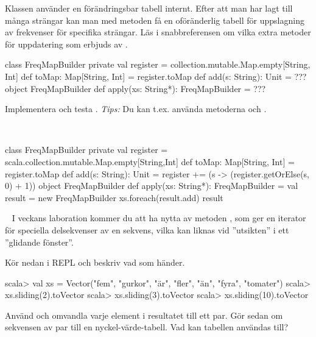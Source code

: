 Klassen använder en förändringsbar tabell internt. Efter att man har lagt till många strängar kan man med metoden  få en oföränderlig tabell för  uppslagning av frekvenser för specifika strängar. Läs i snabbreferensen om vilka extra metoder för uppdatering som erbjuds av .

\begin{Code}
class FreqMapBuilder {
  private val register = collection.mutable.Map.empty[String, Int]
  def toMap: Map[String, Int] = register.toMap
  def add(s: String): Unit = ???
}
object FreqMapBuilder {
  def apply(xs: String*): FreqMapBuilder = ???
}
\end{Code}

\noindent Implementera och testa . \emph{Tips:} Du kan t.ex. använda metoderna \code{+=} och .

\SOLUTION

\TaskSolved \what~
\begin{Code}
class FreqMapBuilder {
  private val register = scala.collection.mutable.Map.empty[String,Int]
  def toMap: Map[String, Int] = register.toMap
  def add(s: String): Unit =
    register += (s -> (register.getOrElse(s, 0) + 1))
}
object FreqMapBuilder {
  def apply(xs: String*): FreqMapBuilder = {
    val result = new FreqMapBuilder
    xs.foreach(result.add)
    result
  }
}
\end{Code}

\QUESTEND




\QUESTBEGIN

\Task  \what~  I veckans laboration kommer du att ha nytta av metoden , som ger en iterator för speciella delsekvenser av en sekvens, vilka kan liknas vid ''utsikten'' i ett ''glidande fönster''.

\Subtask Kör nedan i REPL och beskriv vad som händer.

\begin{REPL}
scala> val xs = Vector("fem", "gurkor", "är", "fler", "än", "fyra", "tomater")
scala> xs.sliding(2).toVector
scala> xs.sliding(3).toVector
scala> xs.sliding(10).toVector
\end{REPL}

\Subtask Använd  och omvandla varje element i resultatet till ett par. Gör sedan om sekvensen av par till en nyckel-värde-tabell. Vad kan tabellen användas till?

